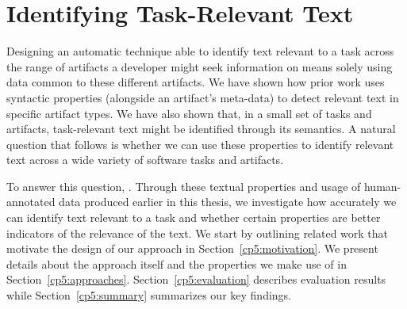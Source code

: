 \setcounter{chapter}{4}
\setcounter{rq}{1}


\chapter{Identifying Task-Relevant Text}
\label{ch:identifying}



Designing an automatic technique able to identify text relevant to a task across the range of artifacts a developer might seek information on means solely using data common to these different artifacts.
We have shown how  prior work uses syntactic properties (alongside an artifact's meta-data)
to detect relevant text in specific artifact types.
We have also shown that, in a small set of tasks and artifacts, task-relevant text might be identified through its semantics.
A natural question that follows is whether we can use these properties to identify relevant text across a wide variety of software tasks and artifacts.




To answer this question, .
Through these textual properties and usage of human-annotated data produced earlier in this thesis, we 
investigate how accurately we can identify text relevant to a task and whether certain properties are better indicators of the relevance of the text.
We start by outlining related work that motivate the design of our approach in Section~\ref{cp5:motivation}.
We present details about the approach itself and the properties we make use of in Section~\ref{cp5:approaches}.
Section~\ref{cp5:evaluation} describes evaluation results while
Section~\ref{cp5:summary} summarizes our key findings.





% 
% 
% 

